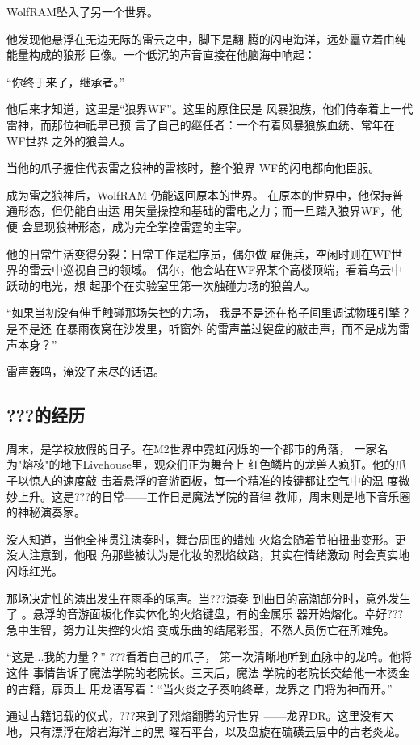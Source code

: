\documentclass[lang=cn,newtx,10pt,scheme=chinese]{elegantbook}
\newcommand{\wf}{WolfRAM}
\newcommand{\dr}{???}
\begin{document}
\wf{}坠入了另一个世界。

他发现他悬浮在无边无际的雷云之中，脚下是翻
腾的闪电海洋，远处矗立着由纯能量构成的狼形
巨像。一个低沉的声音直接在他脑海中响起：

“你终于来了，继承者。”

他后来才知道，这里是“狼界WF”。这里的原住民是
风暴狼族，他们侍奉着上一代雷神，而那位神祇早已预
言了自己的继任者：一个有着风暴狼族血统、常年在WF世界
之外的狼兽人。

当他的爪子握住代表雷之狼神的雷核时，整个狼界
WF的闪电都向他臣服。

成为雷之狼神后，\wf{} 仍能返回原本的世界。
在原本的世界中，他保持普通形态，但仍能自由运
用矢量操控和基础的雷电之力；而一旦踏入狼界WF，他便
会显现狼神形态，成为完全掌控雷霆的主宰。

他的日常生活变得分裂：日常工作是程序员，偶尔做
雇佣兵，空闲时则在WF世界的雷云中巡视自己的领域。
偶尔，他会站在WF界某个高楼顶端，看着乌云中跃动的电光，想
起那个在实验室里第一次触碰力场的狼兽人。

“如果当初没有伸手触碰那场失控的力场，
我是不是还在格子间里调试物理引擎？是不是还
在暴雨夜窝在沙发里，听窗外
的雷声盖过键盘的敲击声，而不是成为雷声本身？”

雷声轰鸣，淹没了未尽的话语。

\subsection{\dr{}的经历}
周末，是学校放假的日子。在M2世界中霓虹闪烁的一个都市的角落，
一家名为"熔核"的地下Livehouse里，观众们正为舞台上
红色鳞片的龙兽人疯狂。他的爪子以惊人的速度敲
击着悬浮的音游面板，每一个精准的按键都让空气中的温
度微妙上升。这是\dr{}的日常——工作日是魔法学院的音律
教师，周末则是地下音乐圈的神秘演奏家。

没人知道，当他全神贯注演奏时，舞台周围的蜡烛
火焰会随着节拍扭曲变形。更没人注意到，他眼
角那些被认为是化妆的烈焰纹路，其实在情绪激动
时会真实地闪烁红光。

那场决定性的演出发生在雨季的尾声。当\dr{}演奏
到曲目的高潮部分时，意外发生了
。悬浮的音游面板化作实体化的火焰键盘，有的金属乐
器开始熔化。幸好\dr{}急中生智，努力让失控的火焰
变成乐曲的结尾彩蛋，不然人员伤亡在所难免。

“这是...我的力量？” \dr{}看着自己的爪子，
第一次清晰地听到血脉中的龙吟。他将这件
事情告诉了魔法学院的老院长。三天后，魔法
学院的老院长交给他一本烫金的古籍，扉页上
用龙语写着：“当火炎之子奏响终章，龙界之
门将为神而开。”

通过古籍记载的仪式，\dr{}来到了烈焰翻腾的异世界
——龙界DR。这里没有大地，只有漂浮在熔岩海洋上的黑
曜石平台，以及盘旋在硫磺云层中的古老炎龙。
\end{document}
